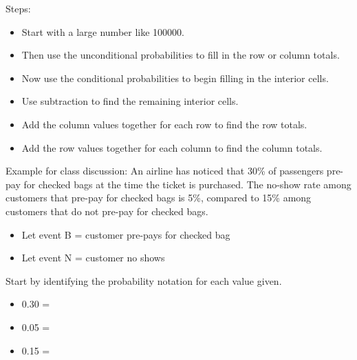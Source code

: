 \documentclass[
]{report}
\providecommand{\tightlist}{%
  \setlength{\itemsep}{0pt}\setlength{\parskip}{0pt}}
\begin{document}
Steps:

\begin{itemize}
\item
  Start with a large number like 100000.
\item
  Then use the unconditional probabilities to fill in the row or column totals.
\item
  Now use the conditional probabilities to begin filling in the interior cells.
\item
  Use subtraction to find the remaining interior cells.
\item
  Add the column values together for each row to find the row totals.
\item
  Add the row values together for each column to find the column totals.
\end{itemize}

\newpage

Example for class discussion: An airline has noticed that 30\% of passengers pre-pay for checked bags at the time the ticket is purchased. The no-show rate among customers that pre-pay for checked bags is 5\%, compared to 15\% among customers that do not pre-pay for checked bags.

\begin{itemize}
\tightlist
\item
  Let event B = customer pre-pays for checked bag
\item
  Let event N = customer no shows
\end{itemize}


Start by identifying the probability notation for each value given.

\begin{itemize}
\tightlist
\item
  0.30 =
\end{itemize}

\vspace{0.1in}

\begin{itemize}
\tightlist
\item
  0.05 =
\end{itemize}

\vspace{0.1in}

\begin{itemize}
\tightlist
\item
  0.15 =
\end{itemize}

\vspace{0.1in}
\end{document}
